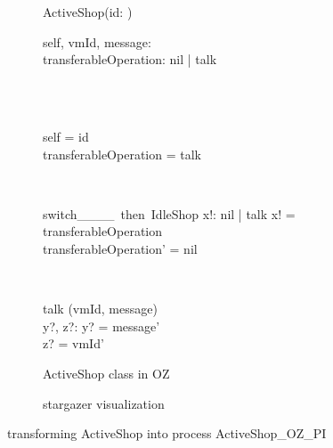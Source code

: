 \begin{figure}[H]
\begin{subfigure}{.6\textwidth}
\centering
\begin{class}{ActiveShop(id: \integer)}
\\
\begin{state}
self, vmId, message: \integer
\\transferableOperation: nil | talk
\end{state} 
\\
\begin{init}
\\self = id
\\transferableOperation = talk
\end{init} 
\\
\begin{op}{switch\_\_\_\_\ then\ IdleShop}
x!: nil | talk
\ST
x! = transferableOperation
\\transferableOperation' = nil
\end{op}
\\
\begin{op}{talk}
\Delta (vmId, message)
\\y?, z?: \integer
\ST
y? = message'
\\z? = vmId'
\end{op}
\end{class}
  \caption{ActiveShop class in OZ}
\end{subfigure}%
\begin{subfigure}{.4\textwidth}
  \centering
{}
  \caption{stargazer visualization}
\end{subfigure}
\caption{transforming ActiveShop into \picalc{} process ActiveShop\_OZ\_PI}
\label{tra_activeShop_OZ}
\end{figure}

